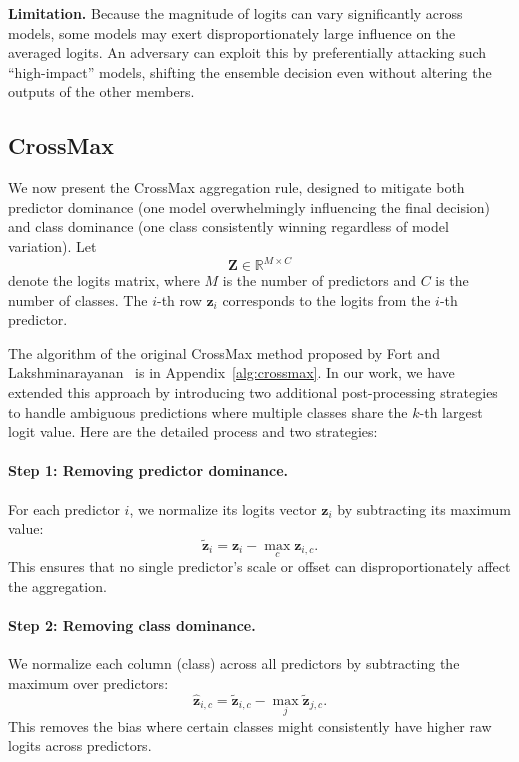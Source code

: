 \noindent
\textbf{Limitation.}  
Because the magnitude of logits can vary significantly across models, some models may exert disproportionately large influence on the averaged logits.
An adversary can exploit this by preferentially attacking such ``high-impact'' models, shifting the ensemble decision even without altering the outputs of the other members.


\subsection{CrossMax}
\label{sec:crossmax}
\indent

We now present the CrossMax aggregation rule, designed to mitigate both predictor dominance (one model overwhelmingly influencing the final decision) and class dominance (one class consistently winning regardless of model variation). Let 
\[
\mathbf{Z} \in \mathbb{R}^{M \times C}
\]
denote the logits matrix, where $M$ is the number of predictors and $C$ is the number of classes. The $i$-th row $\mathbf{z}_i$ corresponds to the logits from the $i$-th predictor.

The algorithm of the original CrossMax method proposed by Fort and Lakshminarayanan~\cite{fort2024ensemble} is in Appendix~\ref{alg:crossmax}.  
In our work, we have extended this approach by introducing two additional post-processing strategies to handle ambiguous predictions where multiple classes share the $k$-th largest logit value.  
Here are the detailed process and two strategies:



\paragraph{Step 1: Removing predictor dominance.}  
For each predictor $i$, we normalize its logits vector $\mathbf{z}_i$ by subtracting its maximum value:
\[
\tilde{\mathbf{z}}_i = \mathbf{z}_i - \max_{c} \mathbf{z}_{i,c}.
\]
This ensures that no single predictor's scale or offset can disproportionately affect the aggregation.

\paragraph{Step 2: Removing class dominance.}  
We normalize each column (class) across all predictors by subtracting the maximum over predictors:
\[
\hat{\mathbf{z}}_{i,c} = \tilde{\mathbf{z}}_{i,c} - \max_{j} \tilde{\mathbf{z}}_{j,c}.
\]
This removes the bias where certain classes might consistently have higher raw logits across predictors.

